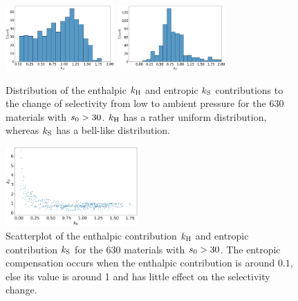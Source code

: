 \documentclass[main.tex]{subfiles}
\begin{document}
\begin{figure}[t]
  \centering
    \includegraphics[width=0.37\textwidth]{figures/2-thermo/k_H.jpg}
    \hspace{8mm}
    \includegraphics[width=0.37\textwidth]{figures/2-thermo/k_S.jpg}
    \caption{Distribution of the enthalpic $k_{\text{H}}$ and entropic $k_{\text{S}}$ contributions to the change of selectivity from low to ambient pressure for the 630 materials with $s_{\text{0}}>30$. $k_{\text{H}}$ has a rather uniform distribution, whereas $k_{\text{S}}$ has a bell-like distribution. }
    \label{fgr:distk}
\end{figure}

\begin{figure}[t]
\centering
  \includegraphics[width=0.45\textwidth]{figures/2-thermo/k_S_vs_k_H.jpg}
  \caption{Scatterplot of the enthalpic contribution $k_{\text{H}}$ and entropic contribution $k_{\text{S}}$ for the 630 materials with $s_{\text{0}}>30$. The entropic compensation occurs when the enthalpic contribution is around $0.1$, else its value is around 1 and has little effect on the selectivity change.}
  \label{fgr:scatterk}
\end{figure}
  
\end{document}
